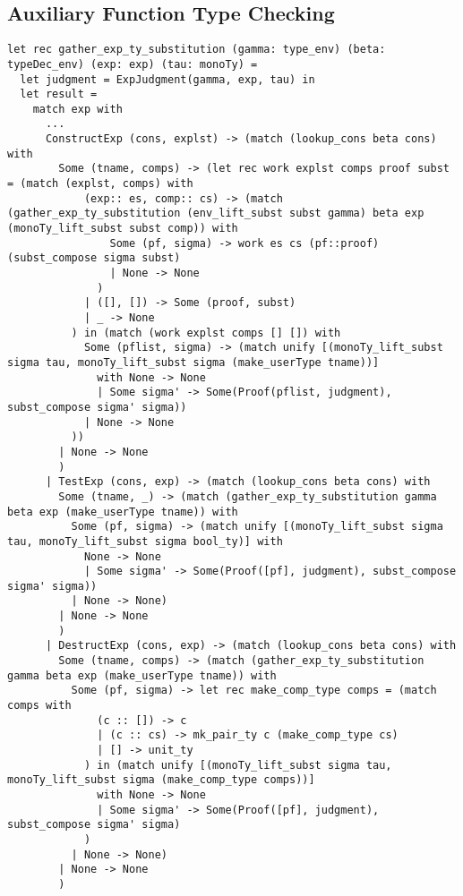 \documentclass[a4paper,12pt]{article}
\begin{document}
	\subsection{Auxiliary Function Type Checking}
		\begin{lstlisting}
let rec gather_exp_ty_substitution (gamma: type_env) (beta: typeDec_env) (exp: exp) (tau: monoTy) =
  let judgment = ExpJudgment(gamma, exp, tau) in
  let result =
    match exp with
      ...
      ConstructExp (cons, explst) -> (match (lookup_cons beta cons) with
        Some (tname, comps) -> (let rec work explst comps proof subst = (match (explst, comps) with
            (exp:: es, comp:: cs) -> (match (gather_exp_ty_substitution (env_lift_subst subst gamma) beta exp (monoTy_lift_subst subst comp)) with
                Some (pf, sigma) -> work es cs (pf::proof) (subst_compose sigma subst)
                | None -> None
              )
            | ([], []) -> Some (proof, subst)
            | _ -> None
          ) in (match (work explst comps [] []) with
            Some (pflist, sigma) -> (match unify [(monoTy_lift_subst sigma tau, monoTy_lift_subst sigma (make_userType tname))]
              with None -> None
              | Some sigma' -> Some(Proof(pflist, judgment), subst_compose sigma' sigma))
            | None -> None 
          ))
        | None -> None
        )
      | TestExp (cons, exp) -> (match (lookup_cons beta cons) with
        Some (tname, _) -> (match (gather_exp_ty_substitution gamma beta exp (make_userType tname)) with
          Some (pf, sigma) -> (match unify [(monoTy_lift_subst sigma tau, monoTy_lift_subst sigma bool_ty)] with
            None -> None
            | Some sigma' -> Some(Proof([pf], judgment), subst_compose sigma' sigma))
          | None -> None)
        | None -> None
        )
      | DestructExp (cons, exp) -> (match (lookup_cons beta cons) with
        Some (tname, comps) -> (match (gather_exp_ty_substitution gamma beta exp (make_userType tname)) with
          Some (pf, sigma) -> let rec make_comp_type comps = (match comps with
              (c :: []) -> c
              | (c :: cs) -> mk_pair_ty c (make_comp_type cs)
              | [] -> unit_ty
            ) in (match unify [(monoTy_lift_subst sigma tau, monoTy_lift_subst sigma (make_comp_type comps))]
              with None -> None
              | Some sigma' -> Some(Proof([pf], judgment), subst_compose sigma' sigma)
            )
          | None -> None)
        | None -> None
        )
		\end{lstlisting}
	
\end{document}

